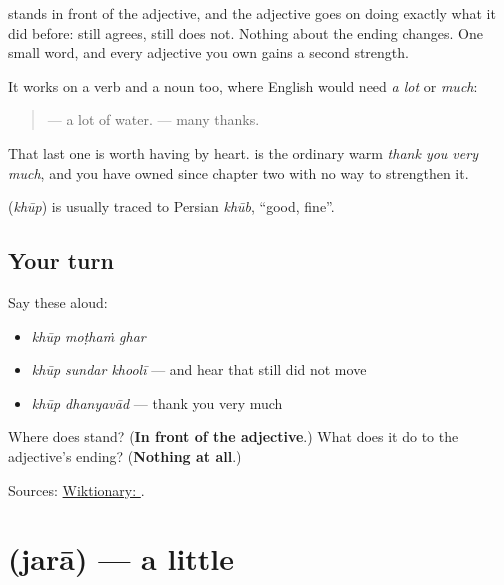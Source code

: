 \textbf{} stands in front of the adjective, and the adjective goes on doing exactly what it did before: \textbf{} still agrees, \textbf{} still does not. Nothing about the ending changes. One small word, and every adjective you own gains a second strength.

It works on a verb and a noun too, where English would need \emph{a lot} or \emph{much}:

\begin{quote}
\textbf{ } — a lot of water. \textbf{ } — many thanks.
\end{quote}

That last one is worth having by heart. \textbf{ } is the ordinary warm \emph{thank you very much}, and you have owned \textbf{} since chapter two with no way to strengthen it.

\begin{cousinweb}
\textbf{} (\emph{khūp}) is usually traced to Persian \emph{khūb}, \textquotedblleft{}good, fine\textquotedblright{}.
\end{cousinweb}

\subsection*{Your turn}
Say these aloud:

\begin{itemize}
\raggedright
  \item \emph{khūp moṭhaṁ ghar}
  \item \emph{khūp sundar khoolī} — and hear that \textbf{} still did not move
  \item \emph{khūp dhanyavād} — thank you very much
\end{itemize}

\begin{tcolorbox}[breakable,colback=teal!4,colframe=teal!35!black,title={Before you move on}]
Where does \textbf{} stand? (\textbf{In front of the adjective}.) What does it do to the adjective's ending? (\textbf{Nothing at all}.)

Sources: \href{https://en.wiktionary.org/wiki/\%E0\%A4\%96\%E0\%A5\%82\%E0\%A4\%AA}{Wiktionary: }.
\end{tcolorbox}
\section[\texorpdfstring{\mr{जरा} (jarā)}{जरा (jarā)}]{ (jarā) — a little}

